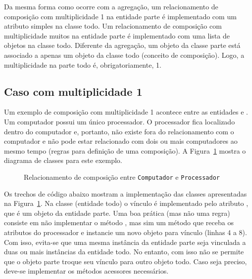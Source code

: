 Da mesma forma como ocorre com a agregação, um relacionamento de composição com multiplicidade 1 na entidade parte é implementado com um atributo simples na classe todo. Um relacionamento de composição com multiplicidade muitos na entidade parte é implementado com uma lista de objetos na classe todo. Diferente da agregação, um objeto da classe parte está associado a apenas um objeto da classe todo (conceito de composição). Logo, a multiplicidade na parte todo é, obrigatoriamente, 1.

\subsection{Caso com multiplicidade 1}

Um exemplo de composição com multiplicidade 1 acontece entre as entidades  e . Um computador possui um único processador. O processador fica localizado dentro do computador e, portanto, não existe fora do relacionamento com o computador e não pode estar relacionado com dois ou mais computadores ao mesmo tempo (regras para definição de uma composição). A Figura~\ref{fig:composicao-computador-processador} mostra o diagrama de classes para este exemplo.

\begin{figure}[h]
	\centering
	
	
	\caption{Relacionamento de composição entre \texttt{Computador} e \texttt{Processador}}
	\label{fig:composicao-computador-processador}
\end{figure}

Os trechos de código abaixo mostram a implementação das classes apresentadas na Figura~\ref{fig:composicao-computador-processador}. Na classe  (entidade todo) o vínculo é implementado pelo atributo , que é um objeto da entidade parte. Uma boa prática (mas não uma regra) consiste em não implementar o método , mas sim um método que receba os atributos do processador e instancie um novo objeto para vínculo (linhas 4 a 8). Com isso, evita-se que uma mesma instância da entidade parte seja vinculada a duas ou mais instâncias da entidade todo. No entanto, com isso não se permite que o objeto parte troque seu vínculo para outro objeto todo. Caso seja preciso, deve-se implementar os métodos acessores necessários.

